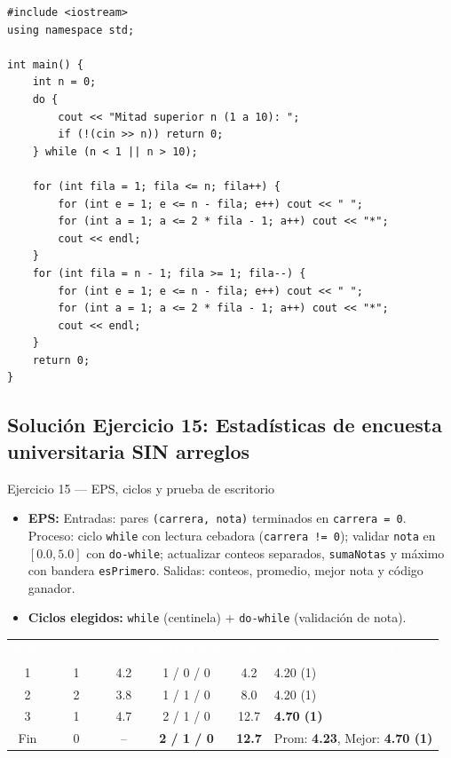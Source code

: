 \documentclass[11pt,letterpaper]{article}
\begin{document}
\begin{lstlisting}[style=cppmonitoria,caption={Solución Ejercicio 14: Diamante de asteriscos (C++)}]
#include <iostream>
using namespace std;

int main() {
    int n = 0;
    do {
        cout << "Mitad superior n (1 a 10): ";
        if (!(cin >> n)) return 0;
    } while (n < 1 || n > 10);

    for (int fila = 1; fila <= n; fila++) {
        for (int e = 1; e <= n - fila; e++) cout << " ";
        for (int a = 1; a <= 2 * fila - 1; a++) cout << "*";
        cout << endl;
    }
    for (int fila = n - 1; fila >= 1; fila--) {
        for (int e = 1; e <= n - fila; e++) cout << " ";
        for (int a = 1; a <= 2 * fila - 1; a++) cout << "*";
        cout << endl;
    }
    return 0;
}
\end{lstlisting}

\subsection{Solución Ejercicio 15: Estadísticas de encuesta universitaria SIN arreglos}

\begin{solucion}{Ejercicio 15 --- EPS, ciclos y prueba de escritorio}
\begin{itemize}
  \item \textbf{EPS:} Entradas: pares \texttt{(carrera, nota)} terminados en \texttt{carrera = 0}. Proceso: ciclo \texttt{while} con lectura cebadora (\texttt{carrera != 0}); validar \texttt{nota} en $[0.0, 5.0]$ con \texttt{do-while}; actualizar conteos separados, \texttt{sumaNotas} y máximo con bandera \texttt{esPrimero}. Salidas: conteos, promedio, mejor nota y código ganador.
  \item \textbf{Ciclos elegidos:} \texttt{while} (centinela) + \texttt{do-while} (validación de nota).
\end{itemize}
\begin{center}
\footnotesize
\renewcommand{\arraystretch}{1.15}
\begin{tabularx}{0.92\linewidth}{c c c c c X}
\rowcolor{AzulMarino}
\textcolor{white}{\textbf{Reg.}} & \textcolor{white}{\texttt{carrera}} & \textcolor{white}{\texttt{nota}} & \textcolor{white}{\textbf{Sis/Ind/Civ}} & \textcolor{white}{\texttt{suma}} & \textcolor{white}{\texttt{mejorNota (carrera)}} \\
1 & 1 & 4.2 & 1 / 0 / 0 & 4.2 & 4.20 (1) \\
2 & 2 & 3.8 & 1 / 1 / 0 & 8.0 & 4.20 (1) \\
3 & 1 & 4.7 & 2 / 1 / 0 & 12.7 & \textbf{4.70 (1)} \\
Fin & 0 & -- & \textbf{2 / 1 / 0} & \textbf{12.7} & Prom: \textbf{4.23}, Mejor: \textbf{4.70 (1)} \\
\bottomrule
\end{tabularx}
\end{center}
\end{solucion}
\end{document}
